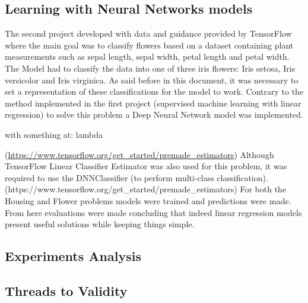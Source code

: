 \subsection{Learning with Neural Networks models}

The second project developed with data and guidance provided by TensorFlow where the main goal was to classify flowers based on a dataset containing plant measurements such as sepal length, sepal width, petal length and petal width. The Model had to classify the data into one of three iris flowers: Iris setosa, Iris versicolor and Iris virginica.  As said before in this document, it was necessary to set a representation of these classifications for the model to work. Contrary to the method implemented in the first project (supervised machine learning with linear regression) to solve this problem a Deep Neural Network model was implemented. 

\begin{tensorflow}[caption={ads}]
with something at: lambda

\end{tensorflow}

(\url{https://www.tensorflow.org/get\_started/premade\_estimators})
Although TensorFlow Linear Classifier Estimator was also used for this problem, it was required to use the DNNClassifier (to perform multi-class classification). (https://www.tensorflow.org/get\_started/premade\_estimators)
For both the Housing and Flower problems models were trained and predictions were made.  From here evaluations were made concluding that indeed linear regression models present useful solutions while keeping things simple. 



\subsection{Experiments Analysis}



\subsection{Threads to Validity}



\endinput



